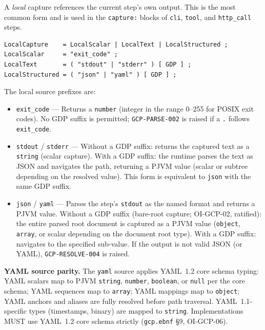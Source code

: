 A \emph{local} capture references the current step's own output.
This is the most common form and is used in the \texttt{capture:} blocks
of \texttt{cli}, \texttt{tool}, and \texttt{http\_call} steps.

\begin{verbatim}
LocalCapture    = LocalScalar | LocalText | LocalStructured ;
LocalScalar     = "exit_code" ;
LocalText       = ( "stdout" | "stderr" ) [ GDP ] ;
LocalStructured = ( "json" | "yaml" ) [ GDP ] ;
\end{verbatim}

\noindent The local source prefixes are:

\begin{itemize}
  \item \texttt{exit\_code} --- Returns a \texttt{number} (integer in the
    range 0--255 for POSIX exit codes).
    No GDP suffix is permitted; \texttt{GCP-PARSE-002} is raised if a
    \texttt{.} follows \texttt{exit\_code}.

  \item \texttt{stdout} / \texttt{stderr} --- Without a GDP suffix: returns
    the captured text as a \texttt{string} (scalar capture).
    With a GDP suffix: the runtime parses the text as JSON and navigates
    the path, returning a PJVM value (scalar or subtree depending on the
    resolved value).
    This form is equivalent to \texttt{json} with the same GDP suffix.

  \item \texttt{json} / \texttt{yaml} --- Parses the step's
    \texttt{stdout} as the named format and returns a PJVM value.
    Without a GDP suffix (bare-root capture; OI-GCP-02, ratified):
    the entire parsed root document is captured as a PJVM value
    (\texttt{object}, \texttt{array}, or scalar depending on the
    document root type).
    With a GDP suffix: navigates to the specified sub-value.
    If the output is not valid JSON (or YAML), \texttt{GCP-RESOLVE-004}
    is raised.
\end{itemize}

\noindent\textbf{YAML source parity.}
The \texttt{yaml} source applies YAML~1.2 core schema typing:
YAML scalars map to PJVM \texttt{string}, \texttt{number}, \texttt{boolean},
or \texttt{null} per the core schema;
YAML sequences map to \texttt{array};
YAML mappings map to \texttt{object};
YAML anchors and aliases are fully resolved before path traversal.
YAML~1.1-specific types (timestamps, binary) are mapped to \texttt{string}.
Implementations MUST use YAML~1.2 core schema strictly
(\texttt{gcp.ebnf} \S9, OI-GCP-06).

